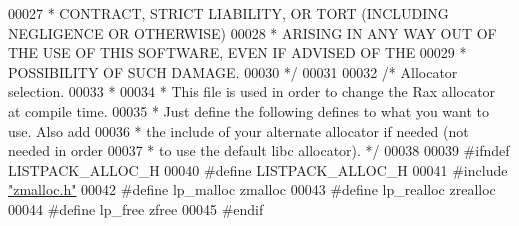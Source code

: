 \begin{DoxyCode}
00027 \textcolor{comment}{ * CONTRACT, STRICT LIABILITY, OR TORT (INCLUDING NEGLIGENCE OR OTHERWISE)}
00028 \textcolor{comment}{ * ARISING IN ANY WAY OUT OF THE USE OF THIS SOFTWARE, EVEN IF ADVISED OF THE}
00029 \textcolor{comment}{ * POSSIBILITY OF SUCH DAMAGE.}
00030 \textcolor{comment}{ */}
00031 
00032 \textcolor{comment}{/* Allocator selection.}
00033 \textcolor{comment}{ *}
00034 \textcolor{comment}{ * This file is used in order to change the Rax allocator at compile time.}
00035 \textcolor{comment}{ * Just define the following defines to what you want to use. Also add}
00036 \textcolor{comment}{ * the include of your alternate allocator if needed (not needed in order}
00037 \textcolor{comment}{ * to use the default libc allocator). */}
00038 
00039 \textcolor{preprocessor}{#}\textcolor{preprocessor}{ifndef} \textcolor{preprocessor}{LISTPACK\_ALLOC\_H}
00040 \textcolor{preprocessor}{#}\textcolor{preprocessor}{define} \textcolor{preprocessor}{LISTPACK\_ALLOC\_H}
00041 \textcolor{preprocessor}{#}\textcolor{preprocessor}{include} \hyperlink{zmalloc_8h}{"zmalloc.h"}
00042 \textcolor{preprocessor}{#}\textcolor{preprocessor}{define} \textcolor{preprocessor}{lp\_malloc} \textcolor{preprocessor}{zmalloc}
00043 \textcolor{preprocessor}{#}\textcolor{preprocessor}{define} \textcolor{preprocessor}{lp\_realloc} \textcolor{preprocessor}{zrealloc}
00044 \textcolor{preprocessor}{#}\textcolor{preprocessor}{define} \textcolor{preprocessor}{lp\_free} \textcolor{preprocessor}{zfree}
00045 \textcolor{preprocessor}{#}\textcolor{preprocessor}{endif}
\end{DoxyCode}
